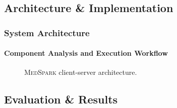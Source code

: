 \documentclass[10pt,    %
    english,            %
    xcolor=table,       %
    envcountsect,        %
    aspectratio=169     %
]{beamer}
\newcommand{\projName}{\textsc{MedSpark}\xspace}
\begin{document}
\subsection{Architecture \& Implementation}

\begin{frame}
    \frametitle{System Architecture}
    \framesubtitle{Component Analysis and Execution Workflow}

    \begin{figure}[H]
        \centering
        \resizebox{0.9\linewidth}{!}{}
        \caption{\projName client-server architecture.}
        \label{fig:system-architecture}
    \end{figure}

\end{frame}

\subsection{Evaluation \& Results}
\end{document}
